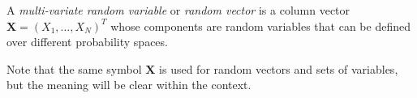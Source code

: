 \begin{definition}
  A \emph{multi-variate random variable} or \emph{random vector} is a column vector \(\bm{X} =
  {(X_1,\dots,X_N)}^T\) whose components are random variables that can be defined
  over different probability spaces.

  Note that the same symbol \(\bm{X}\) is used for random vectors and sets of
  variables, but the meaning will be clear within the context.
\end{definition}

